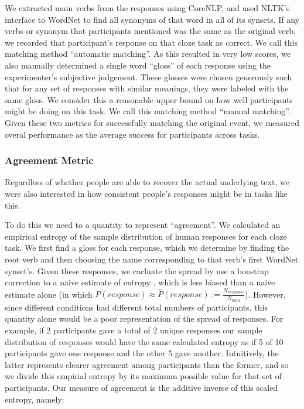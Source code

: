 \documentclass[10pt,a4paper]{article}
\begin{document}
We extracted main verbs from the responses using CoreNLP, and used NLTK's interface to WordNet \cite{bird2009natural, miller1998wordnet} to find all synonyms of that word in all of its synsets. If any verbs or synonym that participants mentioned was the same as the original verb, we recorded that participant's response on that cloze task as correct.
We call this matching method ``automatic matching''.
As this resulted in very low scores, we also manually determined a single word ``gloss'' of each response using the experimenter's subjective judgement. These glosses were chosen generously such that for any set of responses with similar meanings, they were labeled with the same gloss. We consider this a reasonable upper bound on how well participants might be doing on this task.
We call this matching method ``manual matching''.
Given these two metrics for successfully matching the original event, we measured overal performance as the average success for participants across tasks.

\subsubsection{Agreement Metric}

Regardless of whether people are able to recover the actual underlying text, we were also interested in how consistent people's responses might be in tasks like this.

To do this we need to a quantity to represent ``agreement''. We calculated an empirical entropy of the sample distribution of human responses
for each cloze task. We first find a gloss for each response, which we determine by finding the root verb and then choosing the name corresponding to that verb's first WordNet synset's.
Given these responses, we cacluate the spread by use a boostrap correction to a naive estimate of entropy \cite{dedeo2013bootstrap}, which is less biased than a naive estimate alone (in which $P(response) \approx \hat{P}(response) := \frac{N_{response}}{N_{total}}$).
However, since different conditions had different total numbers of participants, this quantity alone would be a poor representation of the spread of responses. For example, if 2 participants gave a total of 2 unique responses our sample distribution of responses would have the same calculated entropy as if 5 of 10 participants gave one response and the other 5 gave another. Intuitively, the latter represents clearer agreement among participants than the former, and so we divide this empirial entropy by its maximum possible value for that set of participants. Our measure of agreement is the additive inverse of this scaled entropy, namely:
\end{document}
